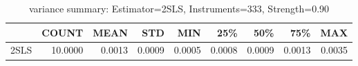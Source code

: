 \begin{table}[ht]
\centering
\caption{variance summary: Estimator=2SLS, Instruments=333, Strength=0.90}
\begin{tabular}{lrrrrrrrr}
\toprule
 & COUNT & MEAN & STD & MIN & 25\% & 50\% & 75\% & MAX \\
\midrule
2SLS & 10.0000 & 0.0013 & 0.0009 & 0.0005 & 0.0008 & 0.0009 & 0.0013 & 0.0035 \\
\bottomrule
\end{tabular}
\end{table}
